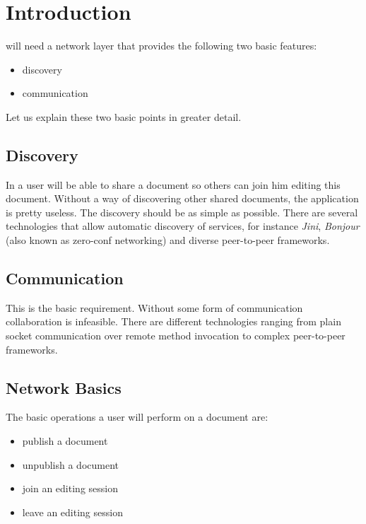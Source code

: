 \documentclass[11pt,a4paper]{article}
\begin{document}
\setlength{\parindent}{0pt}


\newpage

\tableofcontents
\newpage

\listoftables
\listoffigures
\newpage


\section{Introduction}
\ace will need a network layer that provides the following two basic features:

\begin{itemize}
 \item discovery
 \item communication
\end{itemize}

Let us explain these two basic points in greater detail.

\subsection{Discovery}
In \ace a user will be able to share a document so others can join him editing this document. Without a way of discovering other shared documents, the application is pretty useless. The discovery should be as simple as possible. There are several technologies that allow automatic discovery of services, for instance \emph{Jini}, \emph{Bonjour} (also known as zero-conf networking) and diverse peer-to-peer frameworks.

\subsection{Communication}
This is the basic requirement. Without some form of communication collaboration is infeasible. There are different technologies ranging from plain socket communication over remote method invocation to complex peer-to-peer frameworks.

\subsection{Network Basics}
The basic operations a user will perform on a document are:
\begin{itemize}
 \item publish a document
 \item unpublish a document
 \item join an editing session
 \item leave an editing session
\end{itemize}
\end{document}
